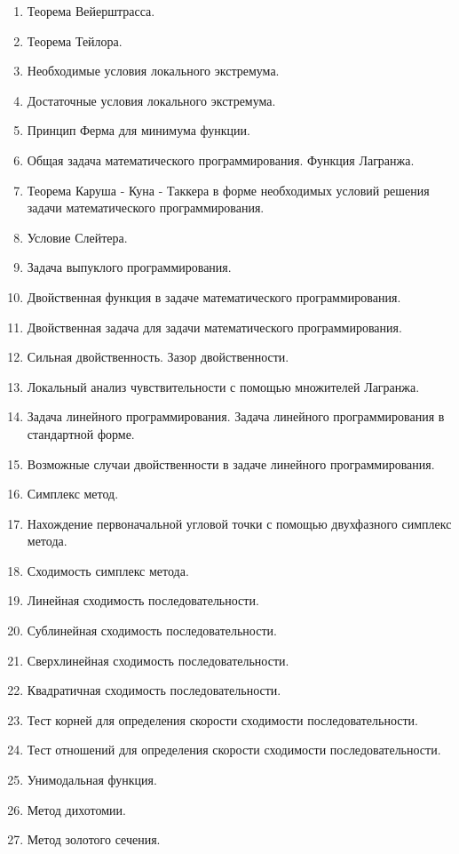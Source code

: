 \documentclass[11pt]{article}
\begin{document}
\begin{enumerate}
    \item Теорема Вейерштрасса.
    \item Теорема Тейлора.
    \item Необходимые условия локального экстремума.
    \item Достаточные условия локального экстремума.
    \item Принцип Ферма для минимума функции.
    \item Общая задача математического программирования. Функция Лагранжа.
    \item Теорема Каруша - Куна - Таккера в форме необходимых условий решения задачи математического программирования.
    \item Условие Слейтера.
    \item Задача выпуклого программирования.
    \item Двойственная функция в задаче математического программирования.
    \item Двойственная задача для задачи математического программирования.
    \item Сильная двойственность. Зазор двойственности.
    \item Локальный анализ чувствительности с помощью множителей Лагранжа.
    \item Задача линейного программирования. Задача линейного программирования в стандартной форме.
    \item Возможные случаи двойственности в задаче линейного программирования.
    \item Симплекс метод.
    \item Нахождение первоначальной угловой точки с помощью двухфазного симплекс метода.
    \item Сходимость симплекс метода.
    \item Линейная сходимость последовательности. 
    \item Сублинейная сходимость последовательности. 
    \item Сверхлинейная сходимость последовательности. 
    \item Квадратичная сходимость последовательности.
    \item Тест корней для определения скорости сходимости последовательности.
    \item Тест отношений для определения скорости сходимости последовательности.
    \item Унимодальная функция.
    \item Метод дихотомии.
    \item Метод золотого сечения.

\end{enumerate}
\end{document}
